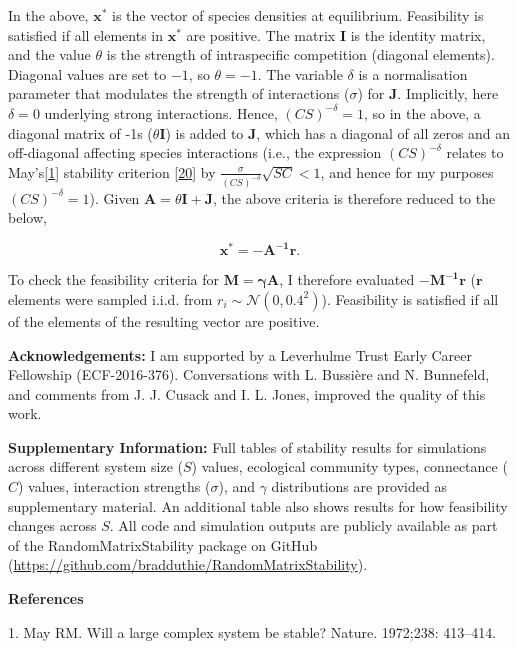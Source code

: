 \documentclass[]{article}
\begin{document}
In the above, \(\mathbf{x^{*}}\) is the vector of species densities at
equilibrium. Feasibility is satisfied if all elements in
\(\mathbf{x^{*}}\) are positive. The matrix \(\mathbf{I}\) is the
identity matrix, and the value \(\theta\) is the strength of
intraspecific competition (diagonal elements). Diagonal values are set
to \(-1\), so \(\theta = -1\). The variable \(\delta\) is a
normalisation parameter that modulates the strength of interactions
(\(\sigma\)) for \(\mathbf{J}\). Implicitly, here \(\delta = 0\)
underlying strong interactions. Hence, \((CS)^{-\delta} = 1\), so in the
above, a diagonal matrix of -1s (\(\theta \mathbf{I}\)) is added to
\(\mathbf{J}\), which has a diagonal of all zeros and an off-diagonal
affecting species interactions (i.e., the expression \((CS)^{-\delta}\)
relates to May's{[}\protect\hyperlink{ref-May1972}{1}{]} stability
criterion {[}\protect\hyperlink{ref-Dougoud2018}{20}{]} by
\(\frac{\sigma}{(CS)^{-\delta}}\sqrt{SC} < 1\), and hence for my
purposes \((CS)^{-\delta} = 1\)). Given
\(\mathbf{A} = \theta\mathbf{I + J}\), the above criteria is therefore
reduced to the below,

\[\mathbf{x^{*} = -A^{-1}r}.\]

To check the feasibility criteria for \(\mathbf{M = \gamma A}\), I
therefore evaluated \(\mathbf{-M^{-1}r}\) (\(\mathbf{r}\) elements were
sampled i.i.d. from \(r_{i} \sim \mathcal{N}(0, 0.4^{2})\)). Feasibility
is satisfied if all of the elements of the resulting vector are
positive.

\textbf{Acknowledgements:} I am supported by a Leverhulme Trust Early
Career Fellowship (ECF-2016-376). Conversations with L. Bussière and N.
Bunnefeld, and comments from J. J. Cusack and I. L. Jones, improved the
quality of this work.

\textbf{Supplementary Information:} Full tables of stability results for
simulations across different system size (\(S\)) values, ecological
community types, connectance (\(C\)) values, interaction strengths
(\(\sigma\)), and \(\gamma\) distributions are provided as supplementary
material. An additional table also shows results for how feasibility
changes across \(S\). All code and simulation outputs are publicly
available as part of the RandomMatrixStability package on GitHub
(\url{https://github.com/bradduthie/RandomMatrixStability}).

\textbf{References}

\hypertarget{refs}{}
\hypertarget{ref-May1972}{}
1. May RM. Will a large complex system be stable? Nature. 1972;238:
413--414.
\end{document}
